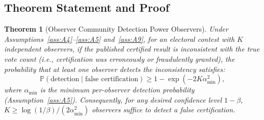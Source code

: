 \documentclass[11pt,a4paper]{article}
\newtheorem{theorem}{Theorem}[section]
\theoremstyle{definition}
\newcommand{\Pbb}{\mathbb{P}}
\begin{document}
\subsection{Theorem Statement and Proof}
\begin{theorem}[Observer Community Detection Power Observers]
\label{thm:observer_detection}
Under Assumptions~\ref{ass:A4}--\ref{ass:A5} and~\ref{ass:A9}, for an electoral contest with $K$ independent observers, if the published certified result is inconsistent with the true vote count (i.e., certification was erroneously or fraudulently granted), the probability that at least one observer detects the inconsistency satisfies:
\begin{equation}
    \Pbb(\text{detection} \mid \text{false certification}) \geq 1 - \exp(-2K \alpha_{\min}^2),
    \label{eq:observer_detection_theorem}
\end{equation}
where $\alpha_{\min}$ is the minimum per-observer detection probability (Assumption~\ref{ass:A5}). Consequently, for any desired confidence level $1 - \beta$, $K \geq \log(1/\beta) / (2\alpha_{\min}^2)$ observers suffice to detect a false certification.
\end{theorem}
\end{document}
